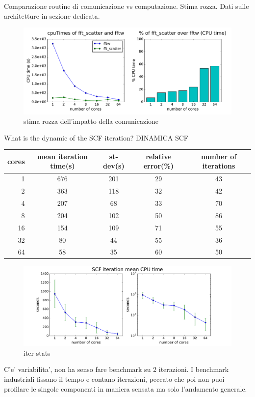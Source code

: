 \documentclass[a4paper,12pt]{article}
\begin{document}
\newpage

Comparazione routine di comunicazione vs computazione.
Stima rozza. Dati sulle architetture in sezione dedicata.
\begin{figure}[hhh!]
	\centerline{\includegraphics[width=1.2\linewidth]{fftw_vs_fft_scatter.pdf}}
	\caption{ stima rozza dell'impatto della comunicazione
	}
	\label{fig:fftwvsfftscatter}
\end{figure}


\newpage
What is the dynamic of the SCF iteration?
DINAMICA SCF
\begin{center}
\begin{tabular}{r|cccc}
\toprule
cores &        mean iteration time(s) &         st-dev(s) &   relative error(\%) &   number of iterations \\
\midrule
1  &  676 &  201 &  29 &  43 \\
2  &  363 &  118 &  32 &  42 \\
4  &  207 &   68 &  33 &  70 \\
8  &  204 &  102 &  50 &  86 \\
16 &  154 &  109 &  71 &  55 \\
32 &   80 &   44 &  55 &  36 \\
64 &   58 &   35 &  60 &  50 \\
\bottomrule
\end{tabular}
\end{center}


\begin{figure}[hhh!]
	\centerline{\includegraphics[width=1.2\linewidth]{iterstats.pdf}}
	\caption{ iter stats
	}
	\label{fig:iterstats}
\end{figure}
C'e' variabilita', non ha senso fare benchmark su 2 iterazioni. 
I benchmark industriali fissano il tempo e contano iterazioni, peccato che poi non puoi profilare le singole componenti in maniera sensata ma solo l'andamento generale.
\end{document}
